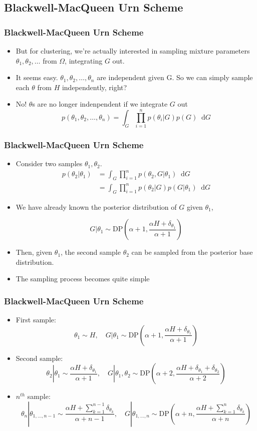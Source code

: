 \documentclass{beamer}
\newcommand*\diff{\mathop{}\!\mathrm{d}}
\begin{document}
\subsection{Blackwell-MacQueen Urn Scheme}
\begin{frame}
\frametitle{Blackwell-MacQueen Urn Scheme}
	\begin{itemize}
		\item{But for clustering, we're actually interested in sampling mixture parameters $\theta_1, \theta_2, \ldots$ from $\Omega$, integrating $G$ out.}
		\pause
		\item It seems easy. $\theta_1, \theta_2, \ldots, \theta_n$ are independent given G. So we can simply sample each $\theta$ from $H$ independently, right?
		\pause
		\item No! $\theta$s are no longer indenpendent if we integrate $G$ out
		\[
		p(\theta_1, \theta_2, \ldots, \theta_n) = \int_G \prod_{i=1}^{n} p(\theta_i|G)p(G) \diff G
		\]
	\end{itemize}
\end{frame}
\begin{frame}
	\frametitle{Blackwell-MacQueen Urn Scheme}
	\begin{itemize}
		\item Consider two samples $\theta_1, \theta_2$.
		\begin{align*}
		p(\theta_2 | \theta_1) & = \int_G \prod_{i=1}^{n} p(\theta_2, G| \theta_1) \diff G \\
		& = \int_G \prod_{i=1}^{n} p(\theta_2|G) p(G|\theta_1) \diff G 
		\end{align*}
		\item We have already known the posterior distribution of $G$ given $\theta_1$,
		
		\[
		G|\theta_1 \sim \text{DP}(\alpha+1, \frac{\alpha H + \delta_{\theta_1}}{\alpha+1})
		\]
		\item Then, given $\theta_1$, the second sample $\theta_2$ can be sampled from the posterior base distribution.
		\item The sampling process becomes quite simple		
	\end{itemize}
\end{frame}
\begin{frame}
	\frametitle{Blackwell-MacQueen Urn Scheme}
	\begin{itemize}
		\item First sample: 
			\[ \theta_1 \sim H, \quad G|\theta_1 \sim \text{DP}(\alpha+1, \frac{\alpha H + \delta_{\theta_1}}{\alpha+1}) \]
		\item Second sample:
			\[ \theta_2|\theta_1 \sim \frac{\alpha H + \delta_{\theta_1}}{\alpha+1}, \quad G|\theta_1,\theta_2 \sim \text{DP}(\alpha+2, \frac{\alpha H + \delta_{\theta_1} + \delta_{\theta_2}}{\alpha+2}) \]
		\item $n^{th}$ sample:
			\[ \theta_n|\theta_{1,\ldots,n-1} \sim \frac{\alpha H + \sum_{k=1}^{n-1}\delta_{\theta_k}}{\alpha+n-1}, \quad G|\theta_{1,\ldots,n} \sim \text{DP}(\alpha+n, \frac{\alpha H + \sum_{k=1}^{n}\delta_{\theta_k}}{\alpha+n}) \]
	\end{itemize}
\end{frame}
\end{document}

